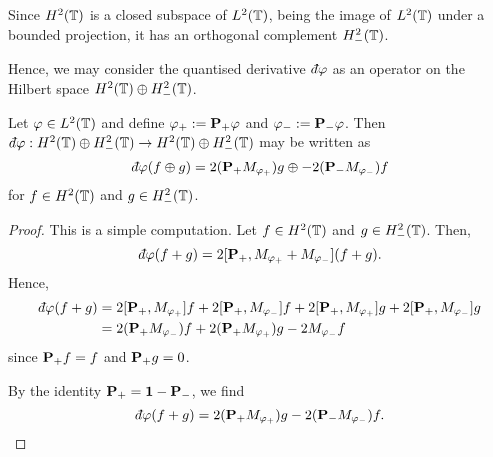 Since $H^2(\mathbb{T})$
is a closed subspace of $L^2(\mathbb{T})$, being the image of $L^2(\mathbb{T})$
under a bounded projection, it has an orthogonal complement $H^2_-(\mathbb{T})$.

Hence, we may consider the quantised derivative $\qd\varphi$ as an operator on
the Hilbert space $H^2(\mathbb{T})\oplus H^2_-(\mathbb{T})$.

\begin{lemma}
    Let $\varphi \in L^2(\mathbb{T})$ and define $\varphi_+ := \mathbf{P}_+ \varphi$ and $\varphi_- := \mathbf{P}_- \varphi$. Then $\qd\varphi:H^2(\Circ)\oplus H^2_-(\Circ)\rightarrow H^2(\Circ)\oplus H^2_-(\Circ)$ may be written as
    \begin{equation*}
        \qd\varphi(f\oplus g) = 
            2(\Proj_+M_{\varphi_+})g \oplus
            -2(\Proj_-M_{\varphi_-})f
    \end{equation*}
    for $f \in H^2(\mathbb{T})$ and $g \in H^2_-(\mathbb{T})$.
\end{lemma}
\begin{proof}
    This is a simple computation. Let $f \in H^2(\mathbb{T})$ and $g \in H^2_-(\mathbb{T})$. Then,
    \begin{equation*}
        \qd\varphi(f+g) = 2[\Proj_+,M_{\varphi_+}+M_{\varphi_-}](f+g).
    \end{equation*}
    Hence,
    \begin{align*}
        \qd\varphi(f+g) &= 2[\Proj_+,M_{\varphi_+}]f + 2[\Proj_+,M_{\varphi_-}]f + 2[\Proj_+,M_{\varphi_+}]g + 2[\Proj_+,M_{\varphi_-}]g\\
        &= 2(\Proj_+M_{\varphi_-})f+2(\Proj_+M_{\varphi_+})g-2M_{\varphi_-}f
    \end{align*}
    since $\mathbf{P}_+f = f$ and $\mathbf{P}_+g = 0$.
    
    By the identity $\mathbf{P}_+ = \mathbf{1}-\mathbf{P}_-$, we find
    \begin{equation*}
        \qd\varphi(f+g) = 2(\Proj_+M_{\varphi_+})g - 2(\Proj_-M_{\varphi_-})f.
    \end{equation*}
\end{proof}



